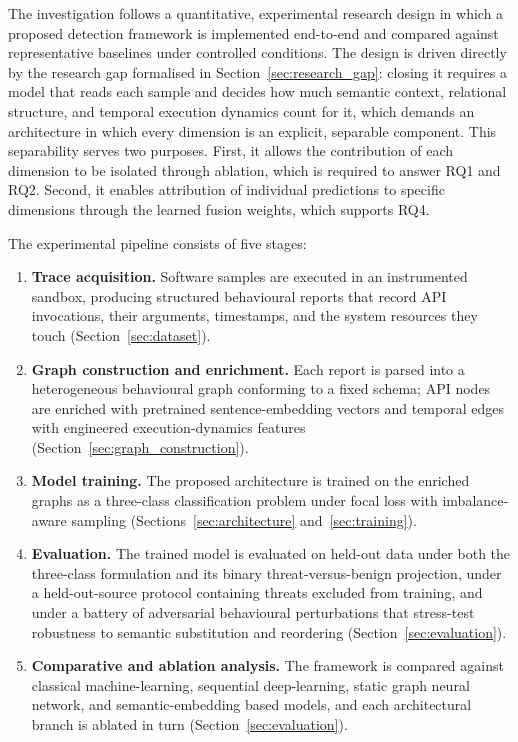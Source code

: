 \documentclass[%
    BCOR=10mm,
    DIV=13,
    toc=bibliography,
    toc=listof,
    oneside,
    12pt,
]{scrbook}
\begin{document}
The investigation follows a quantitative, experimental research design in
which a proposed detection framework is implemented end-to-end and compared
against representative baselines under controlled conditions. The design is
driven directly by the research gap formalised in
Section~\ref{sec:research_gap}: closing it requires a model that reads each
sample and decides how much semantic context, relational structure, and
temporal execution dynamics count for it, which demands an architecture in
which every dimension is an explicit, separable component. This
separability serves two purposes. First, it allows the contribution of each
dimension to be isolated through ablation, which is required to answer RQ1 and
RQ2. Second, it enables attribution of individual predictions to specific
dimensions through the learned fusion weights, which supports RQ4.

The experimental pipeline consists of five stages:

\begin{enumerate}[leftmargin=*]
  \item \textbf{Trace acquisition.} Software samples are executed in an
        instrumented sandbox, producing structured behavioural reports that
        record API invocations, their arguments, timestamps, and the system
        resources they touch (Section~\ref{sec:dataset}).
  \item \textbf{Graph construction and enrichment.} Each report is parsed into
        a heterogeneous behavioural graph conforming to a fixed schema; API
        nodes are enriched with pretrained sentence-embedding vectors and
        temporal edges with engineered execution-dynamics features
        (Section~\ref{sec:graph_construction}).
  \item \textbf{Model training.} The proposed architecture is trained on the
        enriched graphs as a three-class classification problem under focal
        loss with imbalance-aware sampling (Sections~\ref{sec:architecture}
        and~\ref{sec:training}).
  \item \textbf{Evaluation.} The trained model is evaluated on held-out data
        under both the three-class formulation and its binary
        threat-versus-benign projection, under a held-out-source protocol
        containing threats excluded from training, and under a battery
        of adversarial behavioural perturbations that stress-test robustness to
        semantic substitution and reordering (Section~\ref{sec:evaluation}).
  \item \textbf{Comparative and ablation analysis.} The framework is compared
        against classical machine-learning, sequential deep-learning, static
        graph neural network, and semantic-embedding based models, and each architectural
        branch is ablated in turn (Section~\ref{sec:evaluation}).
\end{enumerate}
\end{document}
